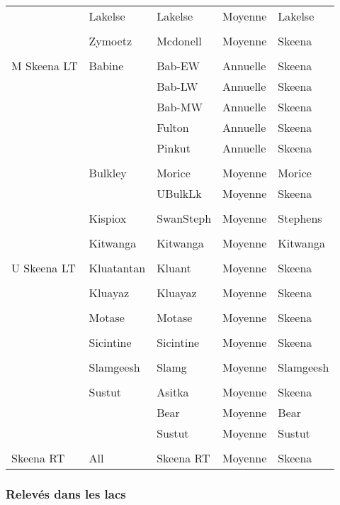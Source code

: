 \documentclass[french,11pt]{book}
\begin{document}
\begin{longtable}[t]{lllll}
\cmidrule(l){2-5}\\  & Lakelse & Lakelse & Moyenne & Lakelse\\
\cmidrule(l){2-5}\\  & Zymoetz & Mcdonell & Moyenne & Skeena\\
\midrule\\ M Skeena LT & Babine & Bab-EW & Annuelle & Skeena\\  &  & Bab-LW & Annuelle & Skeena\\  &  & Bab-MW & Annuelle & Skeena\\  &  & Fulton & Annuelle & Skeena\\  &  & Pinkut & Annuelle & Skeena\\
\cmidrule(l){2-5}\\  & Bulkley & Morice & Moyenne & Morice\\  &  & UBulkLk & Moyenne & Skeena\\
\cmidrule(l){2-5}\\  & Kispiox & SwanSteph & Moyenne & Stephens\\
\cmidrule(l){2-5}\\  & Kitwanga & Kitwanga & Moyenne & Kitwanga\\
\midrule\\ U Skeena LT & Kluatantan & Kluant & Moyenne & Skeena\\
\cmidrule(l){2-5}\\  & Kluayaz & Kluayaz & Moyenne & Skeena\\
\cmidrule(l){2-5}\\  & Motase & Motase & Moyenne & Skeena\\
\cmidrule(l){2-5}\\  & Sicintine & Sicintine & Moyenne & Skeena\\
\cmidrule(l){2-5}\\  & Slamgeesh & Slamg & Moyenne & Slamgeesh\\
\cmidrule(l){2-5}\\  & Sustut & Asitka & Moyenne & Skeena\\  &  & Bear & Moyenne & Bear\\  &  & Sustut & Moyenne & Sustut\\
\midrule\\ Skeena RT & All & Skeena RT & Moyenne & Skeena\\* \end{longtable}

\endgroup{} \endgroup{}

\clearpage

\subsubsection{Relevés dans les lacs}\label{relevuxe9s-dans-les-lacs}
\end{document}
